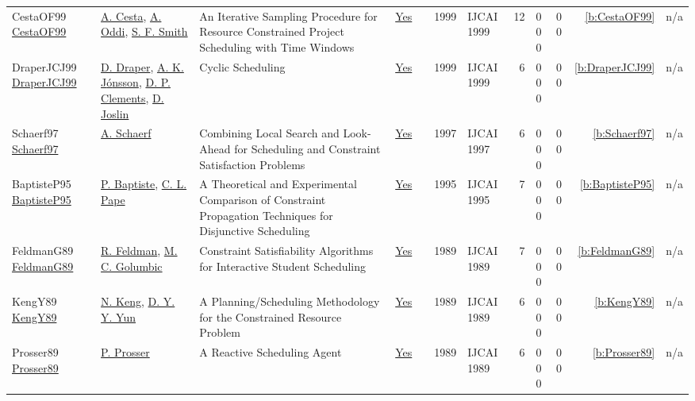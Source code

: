 {\begin{longtable}{>{\raggedright\arraybackslash}p{3cm}>{\raggedright\arraybackslash}p{4.5cm}>{\raggedright\arraybackslash}p{6.0cm}rrrp{2.5cm}rp{1cm}p{1cm}rr}
CestaOF99 \href{http://ijcai.org/Proceedings/99-2/Papers/051.pdf}{CestaOF99} & \hyperref[auth:a284]{A. Cesta}, \hyperref[auth:a282]{A. Oddi}, \hyperref[auth:a298]{S. F. Smith} & An Iterative Sampling Procedure for Resource Constrained Project Scheduling with Time Windows & \href{../works/CestaOF99.pdf}{Yes} & \cite{CestaOF99} & 1999 & IJCAI 1999 & 12 & 0 0 0 & 0 0 & \ref{b:CestaOF99} & n/a\\
DraperJCJ99 \href{http://ijcai.org/Proceedings/99-2/Papers/050.pdf}{DraperJCJ99} & \hyperref[auth:a1440]{D. Draper}, \hyperref[auth:a1042]{A. K. J{\'{o}}nsson}, \hyperref[auth:a1441]{D. P. Clements}, \hyperref[auth:a1442]{D. Joslin} & Cyclic Scheduling & \href{../works/DraperJCJ99.pdf}{Yes} & \cite{DraperJCJ99} & 1999 & IJCAI 1999 & 6 & 0 0 0 & 0 0 & \ref{b:DraperJCJ99} & n/a\\
Schaerf97 \href{http://ijcai.org/Proceedings/97-2/Papers/067.pdf}{Schaerf97} & \hyperref[auth:a1262]{A. Schaerf} & Combining Local Search and Look-Ahead for Scheduling and Constraint Satisfaction Problems & \href{../works/Schaerf97.pdf}{Yes} & \cite{Schaerf97} & 1997 & IJCAI 1997 & 6 & 0 0 0 & 0 0 & \ref{b:Schaerf97} & n/a\\
BaptisteP95 \href{http://ijcai.org/Proceedings/95-1/Papers/079.pdf}{BaptisteP95} & \hyperref[auth:a162]{P. Baptiste}, \hyperref[auth:a163]{C. L. Pape} & A Theoretical and Experimental Comparison of Constraint Propagation Techniques for Disjunctive Scheduling & \href{../works/BaptisteP95.pdf}{Yes} & \cite{BaptisteP95} & 1995 & IJCAI 1995 & 7 & 0 0 0 & 0 0 & \ref{b:BaptisteP95} & n/a\\
FeldmanG89 \href{http://ijcai.org/Proceedings/89-2/Papers/026.pdf}{FeldmanG89} & \hyperref[auth:a1436]{R. Feldman}, \hyperref[auth:a1437]{M. C. Golumbic} & Constraint Satisfiability Algorithms for Interactive Student Scheduling & \href{../works/FeldmanG89.pdf}{Yes} & \cite{FeldmanG89} & 1989 & IJCAI 1989 & 7 & 0 0 0 & 0 0 & \ref{b:FeldmanG89} & n/a\\
KengY89 \href{http://ijcai.org/Proceedings/89-2/Papers/024.pdf}{KengY89} & \hyperref[auth:a1438]{N. Keng}, \hyperref[auth:a1439]{D. Y. Y. Yun} & A Planning/Scheduling Methodology for the Constrained Resource Problem & \href{../works/KengY89.pdf}{Yes} & \cite{KengY89} & 1989 & IJCAI 1989 & 6 & 0 0 0 & 0 0 & \ref{b:KengY89} & n/a\\
Prosser89 \href{http://ijcai.org/Proceedings/89-2/Papers/025.pdf}{Prosser89} & \hyperref[auth:a827]{P. Prosser} & A Reactive Scheduling Agent & \href{../works/Prosser89.pdf}{Yes} & \cite{Prosser89} & 1989 & IJCAI 1989 & 6 & 0 0 0 & 0 0 & \ref{b:Prosser89} & n/a\\
\end{longtable}
}


